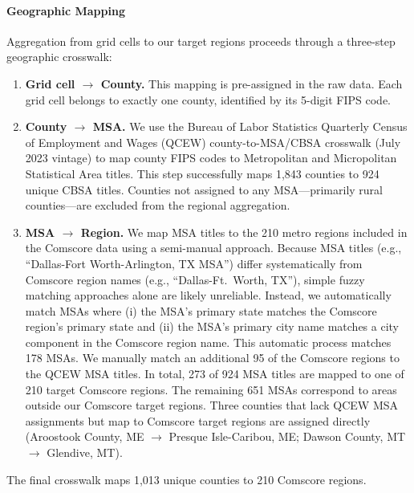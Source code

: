 \documentclass[12pt]{article}
\begin{document}
\paragraph{Geographic Mapping} Aggregation from grid cells to our target regions proceeds through a three-step
geographic crosswalk:
\begin{enumerate}
    \item \textbf{Grid cell $\to$ County.} This mapping is pre-assigned in the raw data. Each grid cell belongs to exactly one county, identified by its
    5-digit FIPS code.
    \item \textbf{County $\to$ MSA.} We use the Bureau of Labor Statistics Quarterly Census of Employment and Wages (QCEW) county-to-MSA/CBSA
    crosswalk (July 2023 vintage) to map county FIPS codes to Metropolitan and Micropolitan Statistical Area titles. This step successfully maps 1,843 counties to 924 unique CBSA titles. Counties not assigned to any
    MSA---primarily rural counties---are excluded from the regional aggregation.


    \item \textbf{MSA $\to$ Region.} We map MSA titles to the 210 metro regions included in the Comscore data
    using a semi-manual approach. Because MSA titles (e.g., ``Dallas-Fort
    Worth-Arlington, TX MSA'') differ systematically from Comscore region names (e.g.,
    ``Dallas-Ft.\ Worth, TX''), simple fuzzy matching approaches alone are likely unreliable.
    Instead, we automatically match MSAs where (i) the MSA's primary state matches the Comscore region's primary state and (ii) the MSA's primary city name matches a city component in the Comscore region name. This automatic process matches 178 MSAs. We manually match an additional 95 of the Comscore regions to the QCEW MSA titles. In total, 273 of 924 MSA titles are mapped to one of 210 target Comscore regions. The remaining 651 MSAs correspond to areas outside our Comscore target regions. Three counties that lack QCEW MSA assignments but map to Comscore target regions are
    assigned directly  (Aroostook County, ME
    $\to$ Presque Isle-Caribou, ME; Dawson County, MT $\to$ Glendive, MT).
\end{enumerate}
The final crosswalk maps 1,013 unique counties to 210 Comscore regions.
\end{document}
